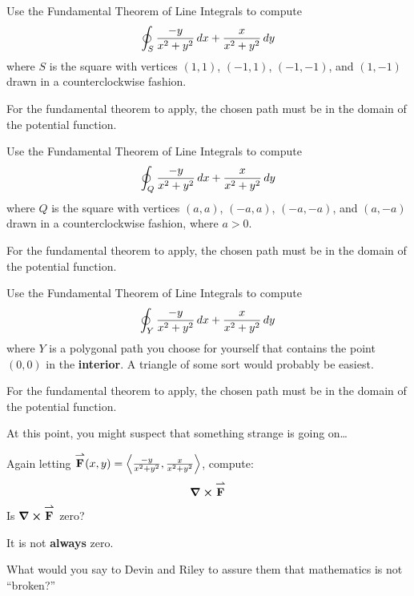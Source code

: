 \documentclass[noauthor,nooutcomes]{ximera}
\begin{document}
\begin{problem}
  Use the Fundamental Theorem of Line Integrals to compute
  \[
  \oint_S \frac{-y}{x^2+y^2}\mathop{}\!d x + \frac{x}{x^2+y^2}\mathop{}\!d y
  \]
  where $S$ is the square with vertices $(1,1)$, $(-1,1)$, $(-1,-1)$,
  and $(1,-1)$ drawn in a counterclockwise fashion.
  \begin{hint}
    For the fundamental theorem to apply, the chosen path must be in
    the domain of the potential function.
  \end{hint}
\end{problem}

\begin{problem}
  Use the Fundamental Theorem of Line Integrals to compute
  \[
  \oint_Q \frac{-y}{x^2+y^2}\mathop{}\!d x + \frac{x}{x^2+y^2}\mathop{}\!d y
  \]
  where $Q$ is the square with vertices $(a,a)$, $(-a,a)$, $(-a,-a)$,
  and $(a,-a)$ drawn in a counterclockwise fashion, where $a>0$.
  \begin{hint}
    For the fundamental theorem to apply, the chosen path must be in
    the domain of the potential function.
  \end{hint}
\end{problem}

\begin{problem}
  Use the Fundamental Theorem of Line Integrals to compute
  \[
  \oint_Y \frac{-y}{x^2+y^2}\mathop{}\!d x + \frac{x}{x^2+y^2}\mathop{}\!d y
  \]
  where $Y$ is a polygonal path you choose for yourself that contains
  the point $(0,0)$ in the \textbf{interior}. A triangle of some sort
  would probably be easiest.
  \begin{hint}
    For the fundamental theorem to apply, the chosen path must be in
    the domain of the potential function.
  \end{hint}
\end{problem}

At this point, you might suspect that something strange is going
on\dots

\begin{problem}
  Again letting ${\overset{\boldsymbol{\rightharpoonup}}{\mathbf{F}}}(x,y) =
  \left\langle \frac{-y}{x^2+y^2},\frac{x}{x^2+y^2}\right\rangle$, compute:
  \[
  \boldsymbol\nabla\boldsymbol\times {\overset{\boldsymbol{\rightharpoonup}}{\mathbf{F}}}
  \]
  Is $\boldsymbol\nabla\boldsymbol\times {\overset{\boldsymbol{\rightharpoonup}}{\mathbf{F}}}$ zero?
  \begin{hint}
    It is not \textbf{always} zero.
  \end{hint}
\end{problem}

\begin{problem}
  What would you say to Devin and Riley to assure them that
  mathematics is not ``broken?''
\end{problem}
\end{document}
